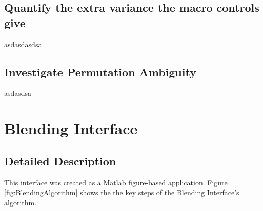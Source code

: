 \documentclass[11pt, oneside]{report}   	%
\begin{document}
\subsection{Quantify the extra variance the macro controls give}
asdasdasdsa
\subsection{Investigate Permutation Ambiguity}
asdasdsa
\pagebreak
\section{Blending Interface}
\subsection{Detailed Description}\label{sec:BlendingDescription}
This interface was created as a Matlab figure-based application. Figure \ref{fig:BlendingAlgorithm} shows the the key steps of the Blending Interface's algorithm.
\end{document}
